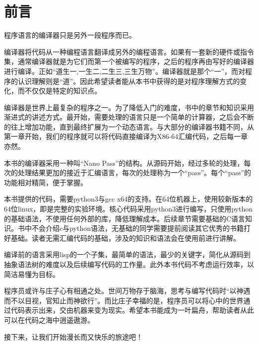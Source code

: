 \chapter{前言}

程序语言的编译器只是另外一段程序而已。

编译器将代码从一种编程语言翻译成另外的编程语言。如果有一套新的硬件或指令集，通常编译器就是为它们而第一个被编写的程序，之后的程序再由写好的编译器进行编译。正如“道生一,一生二,二生三,三生万物”。编译器就是那个“一”，而对程序的认识理解则是“道”。因此希望读者能从本书中获得的是对程序理解方式的变化，而不仅仅是特定的知识点。

编译器是世界上最复杂的程序之一。为了降低入门的难度，书中的章节和知识采用渐进式的讲述方式。最开始，需要处理的语言只是一个简单的计算器，之后会不断的往上增加功能，直到最终扩展为一个动态语言。与大部分的编译器书籍不同，从第一章开始，我们的程序就可以将代码直接编译为X86-64汇编代码，之后每一章亦然。

本书的编译器采用一种叫“Nano Pass”的结构。从源码开始，经过多轮的处理，每次的处理结果更加的接近于汇编语言，每次的处理称为一个“pass”。每个“pass”的功能相对精简，便于掌握。

本书提供的代码，需要python3与gcc x64的支持。在64位机器上，使用较新版本的64位linux，即是完整的实验环境。核心代码采用python3进行编写，只使用python的基础语法，不使用任何外部的库，降低理解成本。后续章节需要基础的C语言知识。书中不会介绍c与python语法，无基础的同学需要提前阅读其它优秀的书籍打好基础。读者无需汇编代码的基础，涉及的知识和语法会在使用前进行讲解。

编译前的语言采用lisp的一个子集，最简单的语法，最少的关键字，简化从源码到抽象语法树的难度以及后续编写代码的工作量。此外本书代码不考虑运行效率，以简洁易懂为目标。

程序员或许与庄子心有相通之处。世间万物存于脑海，思考与编写代码时“以神遇而不以目视，官知止而神欲行”。而比庄子幸福的是，程序员可以将心中的世界通过代码表示出来，交由机器来变为现实。希望本书能成为一叶扁舟，帮助读者从此可以在代码之海中逍遥遨游。

接下来，让我们开始漫长而又快乐的旅途吧！

